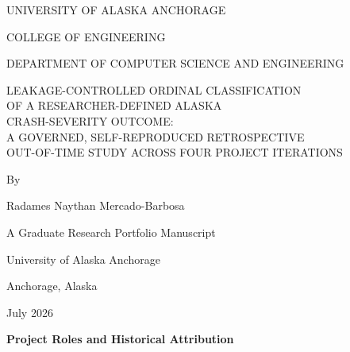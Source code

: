 \documentclass[11pt,letterpaper]{article}
\newcommand{\frontheading}[1]{%
  \begin{center}\bfseries #1\end{center}\vspace{8pt}%
}
\begin{document}
\setcounter{page}{1}
\hypersetup{pageanchor=false}

\begin{titlepage}
\thispagestyle{empty}
\begin{center}
\singlespacing
UNIVERSITY OF ALASKA ANCHORAGE\par
\vspace{5pt}
COLLEGE OF ENGINEERING\par
\vspace{5pt}
DEPARTMENT OF COMPUTER SCIENCE AND ENGINEERING\par

\vspace{1.10in}
\begin{minipage}{0.86\textwidth}
\centering\doublespacing
LEAKAGE-CONTROLLED ORDINAL CLASSIFICATION\\
OF A RESEARCHER-DEFINED ALASKA\\
CRASH-SEVERITY OUTCOME:\\
A GOVERNED, SELF-REPRODUCED RETROSPECTIVE\\
OUT-OF-TIME STUDY ACROSS FOUR PROJECT ITERATIONS
\end{minipage}

\vspace{0.70in}
By\par
\vspace{0.22in}
Radames Naythan Mercado-Barbosa\par

\vfill
A Graduate Research Portfolio Manuscript\par

\vspace{0.55in}
University of Alaska Anchorage\par
Anchorage, Alaska\par
July 2026\par
\end{center}
\end{titlepage}
\hypersetup{pageanchor=true}
\setcounter{page}{2}

\clearpage
\frontheading{Project Roles and Historical Attribution}
\end{document}
